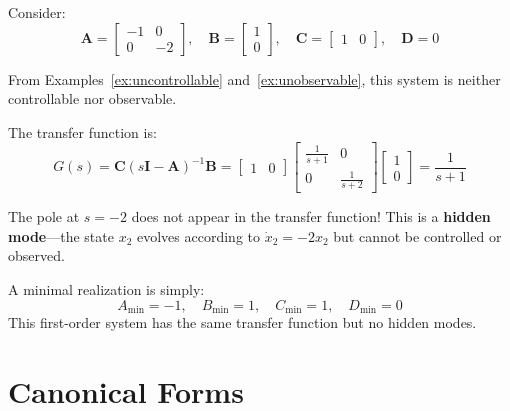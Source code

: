 \begin{example}
\label{ex:non_minimal}
Consider:
\begin{equation}
\mathbf{A} = \begin{bmatrix} -1 & 0 \\ 0 & -2 \end{bmatrix}, \quad \mathbf{B} = \begin{bmatrix} 1 \\ 0 \end{bmatrix}, \quad \mathbf{C} = \begin{bmatrix} 1 & 0 \end{bmatrix}, \quad \mathbf{D} = 0
\end{equation}

From Examples~\ref{ex:uncontrollable} and~\ref{ex:unobservable}, this system is neither controllable nor observable.

The transfer function is:
\begin{equation}
G(s) = \mathbf{C}(s\mathbf{I} - \mathbf{A})^{-1}\mathbf{B} = \begin{bmatrix} 1 & 0 \end{bmatrix}\begin{bmatrix} \frac{1}{s+1} & 0 \\ 0 & \frac{1}{s+2} \end{bmatrix}\begin{bmatrix} 1 \\ 0 \end{bmatrix} = \frac{1}{s+1}
\end{equation}

The pole at $s = -2$ does not appear in the transfer function! This is a \textbf{hidden mode}---the state $x_2$ evolves according to $\dot{x}_2 = -2x_2$ but cannot be controlled or observed.

A minimal realization is simply:
\begin{equation}
A_{\min} = -1, \quad B_{\min} = 1, \quad C_{\min} = 1, \quad D_{\min} = 0
\end{equation}
This first-order system has the same transfer function but no hidden modes.
\end{example}

\section{Canonical Forms}
\label{sec:canonical_forms}

